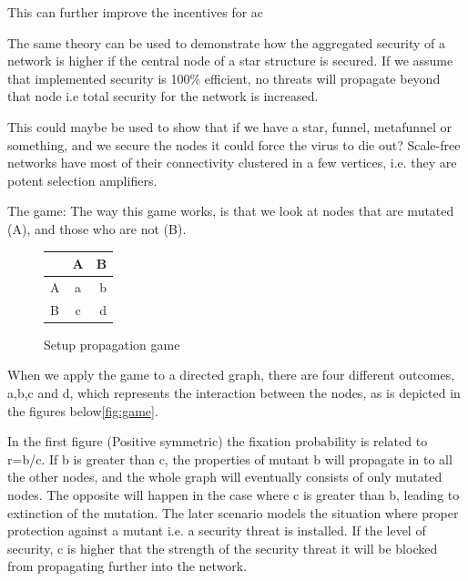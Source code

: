   
 
This can further improve the incentives for ac

The same theory can be used to demonstrate how the aggregated security of a network is higher if the central node of a star structure is secured. 
If we assume that implemented security is 100$\%$ efficient, no threats will propagate beyond that node i.e total security for the network is increased. 

 
This could maybe be used to show that if we have a star, funnel, metafunnel or something, and we secure the nodes it could force the virus to die out?
Scale-free networks have most of their connectivity clustered in a few vertices, i.e. they are potent selection amplifiers.

 
The game:
The way this game works, is that we look at nodes that are mutated (A), and those who are not (B).  
\begin{figure}
\centering 
\begin{tabular}{ l | c | r }
  
   & A & B \\  \hline  
  A & a & b \\ \hline  
  B & c & d \\
  
\end{tabular}
\caption{\label{fig:gamesetup} Setup propagation game \cite{lieberman2005evolutionary}}
\end{figure}

When we apply the game to a directed graph, there are four different outcomes, a,b,c and d, which represents the interaction between the nodes, as is depicted in the figures below\ref{fig:game}. 

In the first figure (Positive symmetric) the fixation probability is related to r=b/c. If b is greater than c, the properties of mutant b will propagate in to all the other nodes, and the whole graph will eventually consists of only mutated nodes. The opposite will happen in the case where c is greater than b, leading to extinction of the mutation. The later scenario models the situation where proper protection against a mutant i.e. a security threat is installed. If the level of security, c is higher that the strength of the security threat it will be blocked from propagating further into the network. 


